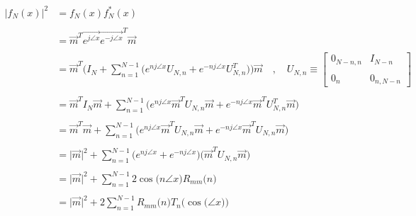 \documentclass{article}
\begin{document}
\begin{align*}
    \Big|f_{N}(x)\Big|^{2}&= f_{N}(x)f^{*}_{N}(x) \\ \\
                          &= \vec{m}^{T}\vec{e^{j\angle{x}}}\vec{e^{-j\angle{x}}}^{T}\vec{m} \\ \\
                          &= \vec{m}^{T}\Bigg(I_{N} + \sum_{n=1}^{N - 1}\Big(e^{nj\angle{x}}U_{N, n} + e^{-nj\angle{x}}U_{N, n}^{T}\Big)\Bigg)\vec{m} \quad , \quad U_{N, n} \equiv \begin{bmatrix}
                                                                                                                                                                                        0_{N - n, n} & I_{N - n} \\ \\
                                                                                                                                                                                        0_{n} & 0_{n, N - n}
                                                                                                                                                                                      \end{bmatrix} \\ \\
                          &= \vec{m}^{T}I_{N}\vec{m} + \sum_{n=1}^{N - 1}\Bigg(e^{nj\angle{x}}\vec{m}^{T}U_{N, n}\vec{m} + e^{-nj\angle{x}}\vec{m}^{T}U_{N, n}^{T}\vec{m}\Bigg) \\ \\
                          &= \vec{m}^{T}\vec{m} + \sum_{n=1}^{N - 1}\Bigg(e^{nj\angle{x}}\vec{m}^{T}U_{N, n}\vec{m} + e^{-nj\angle{x}}\vec{m}^{T}U_{N, n}\vec{m}\Bigg) \\ \\
                          &= \big|\vec{m}\big|^{2} + \sum_{n=1}^{N - 1}\Big(e^{nj\angle{x}} + e^{-nj\angle{x}}\Big)\Big(\vec{m}^{T}U_{N, n}\vec{m}\Big) \\ \\
                          &= \big|\vec{m}\big|^{2} + \sum_{n=1}^{N - 1}2\cos\big(n\angle{x}\big)R_{mm}\big(n\big) \\ \\
                          &= \big|\vec{m}\big|^{2} + 2\sum_{n=1}^{N - 1}R_{mm}\big(n\big)T_{n}\Big(\cos\big(\angle{x}\big)\Big)
\end{align*}
\end{document}
